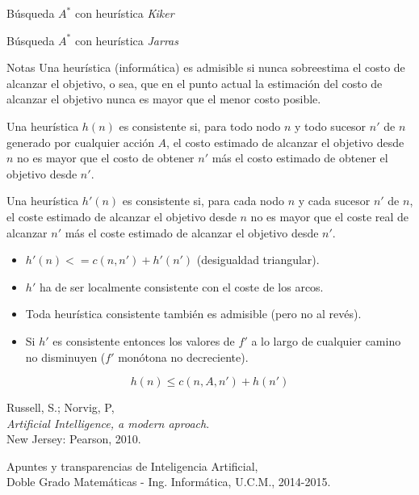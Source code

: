 \documentclass[11pt, a4paper, spanish, openright, twoside]{book}
\begin{document}
\begin{section}{Búsqueda $A^*$ con heurística \textit{Kiker}}


\end{section}
\begin{section}{Búsqueda $A^*$ con heurística \textit{Jarras}}


\end{section}
\begin{section}{Notas}
	Una heurística (informática) es admisible si nunca sobreestima el costo de alcanzar el objetivo, o sea, 
que en el punto actual la estimación del costo de alcanzar el objetivo nunca es mayor que el menor costo posible.

	Una heurística $h(n)$ es consistente si, para todo nodo $n$ y todo sucesor $n'$ de $n$ generado por cualquier acción $A$, el costo estimado de alcanzar el objetivo desde $n$ no es mayor que el costo de obtener $n'$ más el costo estimado de obtener el objetivo desde $n'$.

	Una heurística $h'(n)$ es consistente si, para cada nodo $n$ y cada sucesor $n'$ de $n$, el coste 
	estimado de alcanzar el objetivo desde $n$ no es mayor que el coste real de 
	alcanzar $n'$ más el coste estimado de alcanzar el objetivo desde $n'$.
		\begin{itemize}
		\item  $h'(n) <= c(n, n') + h'(n')$ (desigualdad triangular).
		\item  $h'$  ha de ser localmente consistente con el coste de los arcos.
		\item Toda heurística consistente también es admisible (pero no al revés).
		\item Si $h'$ es consistente entonces los valores de $f'$ a lo largo de cualquier 
		camino no disminuyen ($f'$ monótona no decreciente).
		\end{itemize}

$$h(n) \le c(n, A, n') + h(n')$$
\end{section}
\begin{thebibliography}{9}

	Russell, S.; Norvig, P, \\
	\emph{Artificial Intelligence, a modern aproach}.\\
	New Jersey: Pearson, 2010.
	
	Apuntes y transparencias de Inteligencia Artificial, \\
	Doble Grado Matemáticas - Ing. Informática, U.C.M., 2014-2015.

\end{thebibliography}
\end{document}
